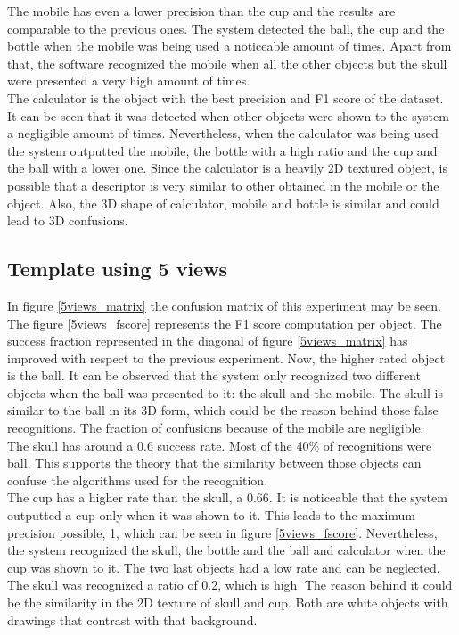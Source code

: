 	The mobile has even a lower precision than the cup and the results are comparable to the previous ones. 
	The system detected the ball, the cup and the bottle when the mobile was being used a noticeable amount of times.
	Apart from that, the software recognized the mobile when all the other objects but the skull were presented a very high amount of times. 
	\\

	The calculator is the object with the best precision and F1 score of the dataset. 
	It can be seen that it was detected when other objects were shown to the system a negligible amount of times. 
	Nevertheless, when the calculator was being used the system outputted the mobile, the bottle with a high ratio and the cup and the ball with a lower one.
	Since the calculator is a heavily 2D textured object, is possible that a descriptor is very similar to other obtained in the mobile or the object. 
	Also, the 3D shape of calculator, mobile and bottle is similar and could lead to 3D confusions.  


	\subsection{Template using 5 views}
	In figure \ref{5views_matrix} the confusion matrix of this experiment may be seen.
	The figure \ref{5views_fscore} represents the F1 score computation per object.  
	The success fraction represented in the diagonal of figure \ref{5views_matrix} has improved with respect to the previous experiment. 
	Now, the higher rated object is the ball. 
	It can be observed that the system only recognized two different objects when the ball was presented to it: the skull and the mobile. 
	The skull is similar to the ball in its 3D form, which could be the reason behind those false recognitions. 
	The fraction of confusions because of the mobile are negligible. 
	\\
	The skull has around a 0.6 success rate. 
	Most of the 40\% of recognitions were ball. 
	This supports the theory that the similarity between those objects can confuse the algorithms used for the recognition. 
	\\

	The cup has a higher rate than the skull, a 0.66. 
	It is noticeable that the system outputted a cup only when it was shown to it. 
	This leads to the maximum precision possible, 1, which can be seen in figure \ref{5views_fscore}.
	Nevertheless, the system recognized the skull, the bottle and the ball and calculator when the cup was shown to it. 
	The two last objects had a low rate and can be neglected. 
	The skull was recognized a ratio of 0.2, which is high. 
	The reason behind it could be the similarity in the 2D texture of skull and cup. 
	Both are white objects with drawings that contrast with that background. 
	\\

